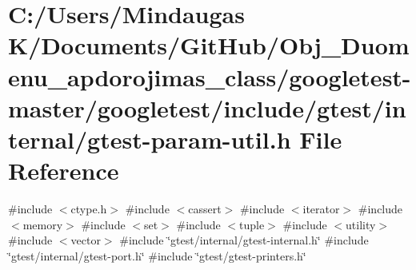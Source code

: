 \hypertarget{googletest-master_2googletest_2include_2gtest_2internal_2gtest-param-util_8h}{}\section{C\+:/\+Users/\+Mindaugas K/\+Documents/\+Git\+Hub/\+Obj\+\_\+\+Duomenu\+\_\+apdorojimas\+\_\+class/googletest-\/master/googletest/include/gtest/internal/gtest-\/param-\/util.h File Reference}
\label{googletest-master_2googletest_2include_2gtest_2internal_2gtest-param-util_8h}
{\ttfamily \#include $<$ctype.\+h$>$}\newline
{\ttfamily \#include $<$cassert$>$}\newline
{\ttfamily \#include $<$iterator$>$}\newline
{\ttfamily \#include $<$memory$>$}\newline
{\ttfamily \#include $<$set$>$}\newline
{\ttfamily \#include $<$tuple$>$}\newline
{\ttfamily \#include $<$utility$>$}\newline
{\ttfamily \#include $<$vector$>$}\newline
{\ttfamily \#include \char`\"{}gtest/internal/gtest-\/internal.\+h\char`\"{}}\newline
{\ttfamily \#include \char`\"{}gtest/internal/gtest-\/port.\+h\char`\"{}}\newline
{\ttfamily \#include \char`\"{}gtest/gtest-\/printers.\+h\char`\"{}}\newline
